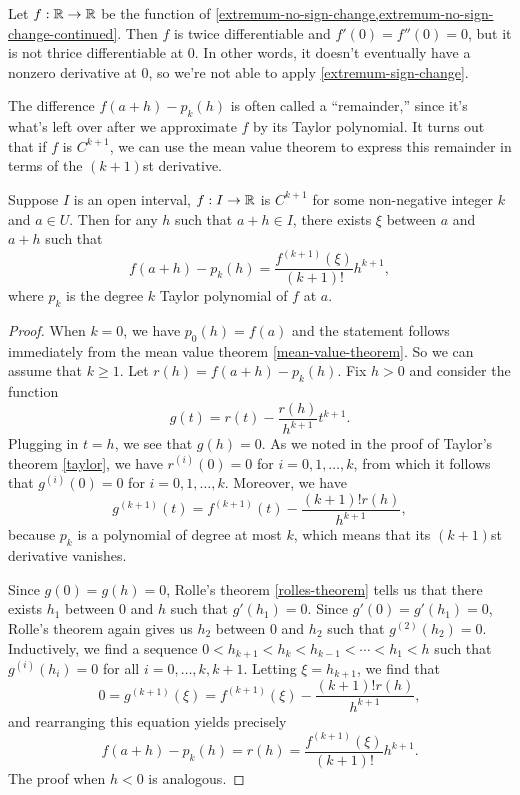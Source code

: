 \begin{example} \label{extremum-no-sign-change-final}
	Let $f : \mathbb{R} \to \mathbb{R}$ be the function of \cref{extremum-no-sign-change,extremum-no-sign-change-continued}. Then $f$ is twice differentiable and $f'(0) = f''(0) = 0$, but it is not thrice differentiable at 0. In other words, it doesn't eventually have a nonzero derivative at 0, so we're not able to apply \cref{extremum-sign-change}. 
\end{example}

The difference $f(a+h) - p_k(h)$ is often called a ``remainder,'' since it's what's left over after we approximate $f$ by its Taylor polynomial. It turns out that if $f$ is $C^{k+1}$, we can use the mean value theorem to express this remainder in terms of the $(k+1)$st derivative. 

\begin{theorem} \label{taylor-single-remainder-lagrange}
	Suppose $I$ is an open interval, $f : I \to \mathbb{R}$ is $C^{k+1}$ for some non-negative integer $k$ and $a \in U$. Then for any $h$ such that $a+h \in I$, there exists $\xi$ between $a$ and $a+h$ such that 
	\[ f(a+h) - p_k(h) = \frac{f^{(k+1)}(\xi)}{(k+1)!}h^{k+1}, \]
	where $p_k$ is the degree $k$ Taylor polynomial of $f$ at $a$. 
\end{theorem}

\begin{proof}
	When $k = 0$, we have $p_0(h) = f(a)$ and the statement follows immediately from the mean value theorem \ref{mean-value-theorem}. So we can assume that $k \geq 1$. Let $r(h) = f(a+h) - p_k(h)$. Fix $h > 0$ and consider the function
	\[ g(t) = r(t) - \frac{r(h)}{h^{k+1}} t^{k+1}.  \]
	Plugging in $t = h$, we see that $g(h) = 0$. As we noted in the proof of Taylor's theorem \ref{taylor}, we have $r^{(i)}(0) = 0$ for $i = 0, 1, \dotsc, k$, from which it follows that $g^{(i)}(0) = 0$ for $i = 0, 1, \dotsc, k$. Moreover, we have \[ g^{(k+1)}(t) = f^{(k+1)}(t) - \frac{(k+1)!r(h)}{h^{k+1}},  \]
	because $p_k$ is a polynomial of degree at most $k$, which means that its $(k+1)$st derivative vanishes. 
	
	Since $g(0) = g(h) = 0$, Rolle's theorem \ref{rolles-theorem} tells us that there exists $h_1$ between $0$ and $h$ such that $g'(h_1) = 0$. Since $g'(0) = g'(h_1) = 0$, Rolle's theorem again gives us $h_2$ between $0$ and $h_2$ such that $g^{(2)}(h_2) = 0$. Inductively, we find a sequence $0 < h_{k+1} < h_k < h_{k-1} < \dotsb < h_1 < h$ such that $g^{(i)}(h_i) = 0$ for all $i = 0, \dotsc, k, k+1$. Letting $\xi = h_{k+1}$, we find that 
	\[ 0 = g^{(k+1)}(\xi) = f^{(k+1)}(\xi) - \frac{(k+1)!r(h)}{h^{k+1}}, \]
	and rearranging this equation yields precisely
	\[ f(a+h) - p_k(h) = r(h) = \frac{f^{(k+1)}(\xi)}{(k+1)!}h^{k+1}. \]
	The proof when $h < 0$ is analogous. 
\end{proof}

